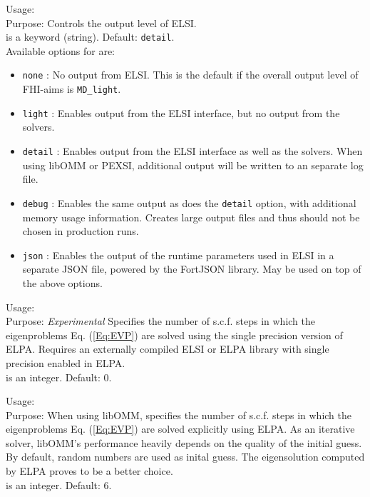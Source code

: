 {
  \noindent
  Usage:   \\[1.0ex]
  Purpose: Controls the output level of ELSI. \\[1.0ex]
   is a keyword (string). Default: \texttt{detail}. \\
}
Available options for  are:
\begin{itemize}
  \item \texttt{none} : No output from ELSI. This is the default if the overall
    output level of FHI-aims is \texttt{MD\_light}.
  \item \texttt{light} : Enables output from the ELSI interface, but no output
    from the solvers.
  \item \texttt{detail} : Enables output from the ELSI interface as well as the
    solvers. When using libOMM or PEXSI, additional output will be written to an
    separate log file.
  \item \texttt{debug} : Enables the same output as does the \texttt{detail}
    option, with additional memory usage information. Creates large output files
    and thus should not be chosen in production runs.
  \item \texttt{json} : Enables the output of the runtime parameters used in
    ELSI in a separate JSON file, powered by the FortJSON library. May be used
    on top of the above options.
\end{itemize}

{
  \noindent
  Usage:   \\[1.0ex]
  Purpose: \emph{Experimental} Specifies the number of s.c.f. steps in which the
    eigenproblems Eq. (\ref{Eq:EVP}) are solved using the single precision
    version of ELPA. Requires an externally compiled ELSI or ELPA library with
    single precision enabled in ELPA. \\[1.0ex]
   is an integer. Default: 0. \\
}

{
  \noindent
  Usage:   \\[1.0ex]
  Purpose: When using libOMM, specifies the number of s.c.f. steps in which the
    eigenproblems Eq. (\ref{Eq:EVP}) are solved explicitly using ELPA. As an
    iterative solver, libOMM's performance heavily depends on the quality of the
    initial guess. By default, random numbers are used as inital guess. The
    eigensolution computed by ELPA proves to be a better choice. \\[1.0ex]
   is an integer. Default: 6. \\
}

